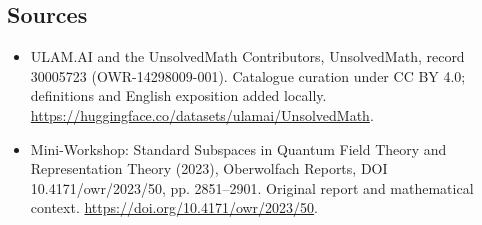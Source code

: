 \documentclass[11pt]{article}
\begin{document}
\subsection{Sources}
\begin{itemize}
\item[\hypertarget{source:30005723:1}{S1}] ULAM.AI and the UnsolvedMath Contributors, UnsolvedMath, record 30005723 (OWR-14298009-001). Catalogue curation under CC BY 4.0; definitions and English exposition added locally.
\url{https://huggingface.co/datasets/ulamai/UnsolvedMath}.
\item[\hypertarget{source:30005723:2}{S2}] Mini-Workshop: Standard Subspaces in Quantum Field Theory and Representation Theory (2023), Oberwolfach Reports, DOI 10.4171/owr/2023/50, pp. 2851--2901. Original report and mathematical context.
\url{https://doi.org/10.4171/owr/2023/50}.
\end{itemize}
\label{end:30005723}
\end{document}
